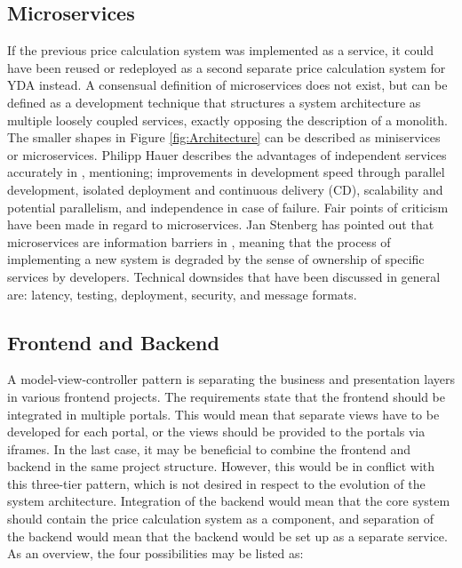 \subsection{Microservices}
If the previous price calculation system was implemented as a service, it could have been reused or redeployed as a second separate price calculation system for YDA instead. A consensual definition of microservices does not exist, but can be defined as a development technique that structures a system architecture as multiple loosely coupled services, exactly opposing the description of a monolith. The smaller shapes in Figure \ref{fig:Architecture} can be described as miniservices or microservices. Philipp Hauer describes the advantages of independent services accurately in \cite{microservices}, mentioning; improvements in development speed through parallel development, isolated deployment and continuous delivery (CD), scalability and potential parallelism, and independence in case of failure. Fair points of criticism have been made in regard to microservices. Jan Stenberg has pointed out that microservices are information barriers in \cite{JS-microservices}, meaning that the process of implementing a new system is degraded by the sense of ownership of specific services by developers. Technical downsides that have been discussed in general are: latency, testing, deployment, security, and message formats.

\subsection{Frontend and Backend}
A model-view-controller pattern is separating the business and presentation layers in various frontend projects. The requirements state that the frontend should be integrated in multiple portals. This would mean that separate views have to be developed for each portal, or the views should be provided to the portals via iframes. In the last case, it may be beneficial to combine the frontend and backend in the same project structure. However, this would be in conflict with this three-tier pattern, which is not desired in respect to the evolution of the system architecture. Integration of the backend would mean that the core system should contain the price calculation system as a component, and separation of the backend would mean that the backend would be set up as a separate service. As an overview, the four possibilities may be listed as:

